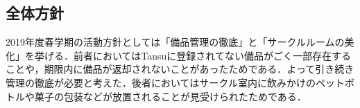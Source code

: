 \subsection*{全体方針}
 2019年度春学期の活動方針としては「備品管理の徹底」と「サークルルームの美化」を挙げる．前者においてはTansuに登録されてない備品がごく一部存在することや，期限内に備品が返却されないことがあったためである．よって引き続き管理の徹底が必要と考えた．後者においてはサークル室内に飲みかけのペットボトルや菓子の包装などが放置されることが見受けられたためである．

